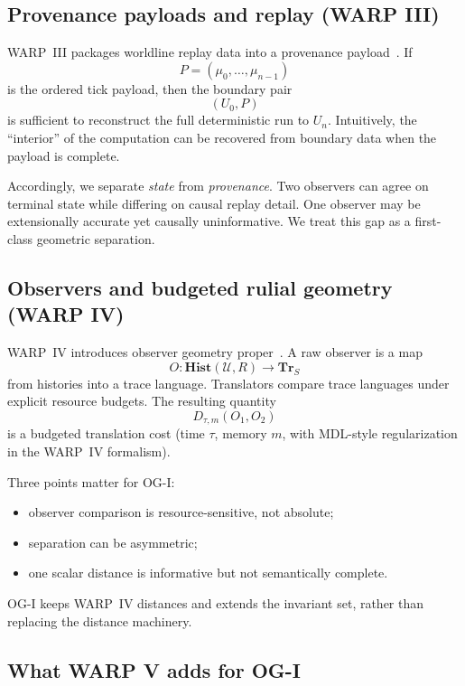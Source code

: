 \documentclass[11pt,twoside]{article}
\theoremstyle{definition}
\newcommand{\Hist}{\mathbf{Hist}}
\newcommand{\Tr}{\mathbf{Tr}}
\begin{document}
\subsection{Provenance payloads and replay (WARP III)}
\label{subsec:tldr-provenance}

WARP~III packages worldline replay data into a provenance payload~\cite{ross_paper_iii}. If
\[
  P=(\mu_0,\ldots,\mu_{n-1})
\]
is the ordered tick payload, then the boundary pair
\[
  (U_0,P)
\]
is sufficient to reconstruct the full deterministic run to \(U_n\). Intuitively, the ``interior'' of the computation can be recovered from boundary data when the payload is complete.

Accordingly, we separate \emph{state} from \emph{provenance}. Two observers can agree on terminal state while differing on causal replay detail. One observer may be extensionally accurate yet causally uninformative. We treat this gap as a first-class geometric separation.

\subsection{Observers and budgeted rulial geometry (WARP IV)}
\label{subsec:tldr-observer-geometry}

WARP~IV introduces observer geometry proper~\cite{ross_paper_iv}. A raw observer is a map
\[
  O:\Hist(\mathcal{U},R)\to\Tr_S
\]
from histories into a trace language. Translators compare trace languages under explicit resource budgets. The resulting quantity
\[
  D_{\tau,m}(O_1,O_2)
\]
is a budgeted translation cost (time \(\tau\), memory \(m\), with MDL-style regularization in the WARP~IV formalism).

Three points matter for OG-I:
\begin{itemize}[leftmargin=*]
  \item observer comparison is resource-sensitive, not absolute;
  \item separation can be asymmetric;
  \item one scalar distance is informative but not semantically complete.
\end{itemize}
OG-I keeps WARP~IV distances and extends the invariant set, rather than replacing the distance machinery.

\subsection{What WARP V adds for OG-I}
\label{subsec:tldr-paper-v}
\end{document}
